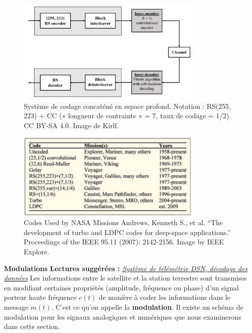 \begin{figure}[H] %
    \centering
    \includegraphics[width=0.8\textwidth]{figures/6-30.jpg}
    \caption{Système de codage concaténé en espace profond. Notation : RS(255, 223) + CC (« longueur de contrainte » = 7, taux de codage = 1/2). CC BY-SA 4.0. Image de Kirlf.}
    \label{fig:communication2}
\end{figure}
\begin{figure}[H] %
    \centering
    \includegraphics[width=0.8\textwidth]{figures/6-31.jpg}
    \caption{Codes Used by NASA Missions Andrews, Kenneth S., et al. “The development of turbo and LDPC codes for deep-space applications.” Proceedings of the IEEE 95.11 (2007): 2142-2156. Image by IEEE Explore.}
    \label{fig:communication2}
\end{figure}
\textbf{Modulations}
\textbf{Lectures suggérées :} 
\href{https://deepspace.jpl.nasa.gov/dsndocs/810-005/208/208B.pdf}{\textit{Système de télémétrie DSN, décodage des données}}
Les informations entre le satellite et la station terrestre sont transmises en modifiant certaines propriétés (amplitude, fréquence ou phase) d'un signal porteur haute fréquence $c(t)$ de manière à coder les informations dans le message $m(t)$.  
C'est ce qu'on appelle la \textbf{modulation}. Il existe un schéma de modulation pour les signaux analogiques et numériques que nous examinerons dans cette section.
\vspace{0.5cm}
